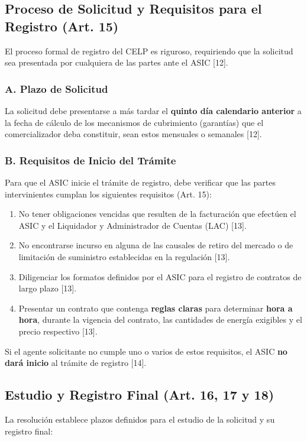 \documentclass[a5paper]{book}%
\begin{document}
\subsection{Proceso de Solicitud y Requisitos para el Registro (Art. 15)}

El proceso formal de registro del CELP es riguroso, requiriendo que la solicitud sea presentada por cualquiera de las partes ante el ASIC [12].

\subsubsection*{A. Plazo de Solicitud}
La solicitud debe presentarse a más tardar el \textbf{quinto día calendario anterior} a la fecha de cálculo de los mecanismos de cubrimiento (garantías) que el comercializador deba constituir, sean estos mensuales o semanales [12].

\subsubsection*{B. Requisitos de Inicio del Trámite}
Para que el ASIC inicie el trámite de registro, debe verificar que las partes intervinientes cumplan los siguientes requisitos (Art. 15):
\begin{enumerate}
	\item No tener obligaciones vencidas que resulten de la facturación que efectúen el ASIC y el Liquidador y Administrador de Cuentas (LAC) [13].
	\item No encontrarse incurso en alguna de las causales de retiro del mercado o de limitación de suministro establecidas en la regulación [13].
	\item Diligenciar los formatos definidos por el ASIC para el registro de contratos de largo plazo [13].
	\item Presentar un contrato que contenga \textbf{reglas claras} para determinar \textbf{hora a hora}, durante la vigencia del contrato, las cantidades de energía exigibles y el precio respectivo [13].
\end{enumerate}
Si el agente solicitante no cumple uno o varios de estos requisitos, el ASIC \textbf{no dará inicio} al trámite de registro [14].

\subsection{Estudio y Registro Final (Art. 16, 17 y 18)}

La resolución establece plazos definidos para el estudio de la solicitud y su registro final:
\end{document}
